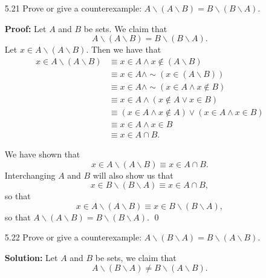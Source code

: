 \begin{enumerate}
      In either case, we concluded that $p \in A$, so that
      $((A \cap B) \cup (A{\backslash}B)) \subseteq A$. That is
      $A = (A \cap B) \cup (A{\backslash}B)$. \qed
   \item[5.21] Prove or give a counterexample:
               $A{\backslash}(A{\backslash}B) = B{\backslash}(B{\backslash}A)$.
               
      \textbf{Proof:} Let $A$ and $B$ be sets. We claim that
      $$A{\backslash}(A{\backslash}B) = B{\backslash}(B{\backslash}A).$$
      Let $x \in A{\backslash}(A{\backslash}B)$. Then we have that
      \begin{align*}
         x \in A{\backslash}(A{\backslash}B)
            &\equiv x \in A \land x \notin (A{\backslash}B) \\
            &\equiv x \in A \land {\sim}(x \in (A{\backslash}B)) \\
            &\equiv x \in A \land {\sim}(x \in A \land x \notin B) \\
            &\equiv x \in A \land (x \notin A \lor x \in B) \\
            &\equiv (x \in A \land x \notin A) \lor (x \in A \land x \in B) \\
            &\equiv x \in A \land x \in B \\
            &\equiv x \in A \cap B.
      \end{align*}
      
      We have shown that
      $$x \in A{\backslash}(A{\backslash}B) \equiv x \in A \cap B.$$
      Interchanging $A$ and $B$ will also show us that
      $$x \in B{\backslash}(B{\backslash}A) \equiv x \in A \cap B,$$
      so that
      $$x \in A{\backslash}(A{\backslash}B) \equiv
        x \in B{\backslash}(B{\backslash}A),$$
      so that $A{\backslash}(A{\backslash}B) = B{\backslash}(B{\backslash}A)$.
      \qed
   \item[5.22] Prove or give a counterexample:
               $A{\backslash}(B{\backslash}A) = B{\backslash}(A{\backslash}B)$.
               
      \textbf{Solution:} Let $A$ and $B$ be sets, we claim that
      $$A{\backslash}(B{\backslash}A) \neq B{\backslash}(A{\backslash}B).$$
      

\end{enumerate}
